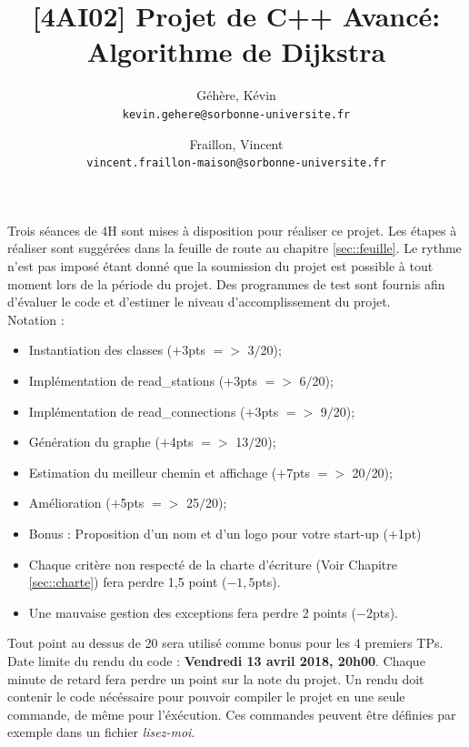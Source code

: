 \documentclass[9pts]{article}
\title{[4AI02] Projet de C++ Avancé: Algorithme de Dijkstra}
\author{
  Géhère, Kévin\\
  \texttt{kevin.gehere@sorbonne-universite.fr}
  \and
  Fraillon, Vincent\\
  \texttt{vincent.fraillon-maison@sorbonne-universite.fr}
}
\begin{document}
\makeatletter

\let\ps@plain=\ps@fancy

\makeatother
\maketitle

Trois séances de 4H sont mises à disposition pour réaliser ce projet.
Les étapes à réaliser sont suggérées dans la feuille de route au chapitre \ref{sec::feuille}. Le rythme n'est pas imposé étant donné que la soumission du projet est possible à tout moment lors de la période du projet.
Des programmes de test sont fournis afin d'évaluer le code et d'estimer le niveau d'accomplissement du projet.\\

Notation :
\begin{itemize}
\item Instantiation des classes ($+$3pts $=>$ 3$/$20);
\item Implémentation de read\_stations ($+$3pts $=>$ 6$/$20);
\item Implémentation de read\_connections ($+$3pts $=>$ 9$/$20);
\item Génération du graphe ($+$4pts $=>$ 13$/$20);
\item Estimation du meilleur chemin et affichage ($+$7pts $=>$ 20$/$20);
\item Amélioration ($+$5pts $=>$ 25$/$20);
\item Bonus : Proposition d'un nom et d'un logo pour votre start-up ($+$1pt)
\item Chaque critère non respecté de la charte d'écriture (Voir Chapitre \ref{sec::charte}) fera perdre 1,5 point ($-1,5$pts).
\item Une mauvaise gestion des exceptions fera perdre 2 points ($-2$pts).\\
\end{itemize}

Tout point au dessus de 20 sera utilisé comme bonus pour les 4 premiers TPs.\\

Date limite du rendu du code : \textbf{Vendredi 13 avril 2018, 20h00}. Chaque minute de retard fera perdre un point sur la note du projet. Un rendu doit contenir le code nécéssaire pour pouvoir compiler le projet en une seule commande, de même pour l'éxécution. Ces commandes peuvent être définies par exemple dans un fichier \emph{lisez-moi}. \\
\end{document}
